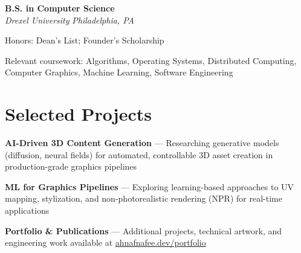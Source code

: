 \documentclass[letterpaper,10pt]{article}
\newcommand{\education}[4]{%
  \textbf{#1} \hfill \textit{#3}\\[-1pt]
  \textit{#2} \hfill \textit{#4}\par\vspace{2pt}
}
\begin{document}
\education{B.S. in Computer Science}{Drexel University}{}{Philadelphia, PA}
\begin{tightitemize}
  \item Honors: Dean's List; Founder's Scholarship
  \item Relevant coursework: Algorithms, Operating Systems, Distributed Computing, Computer Graphics, Machine Learning, Software Engineering
\end{tightitemize}

\section*{Selected Projects}
\begin{tightitemize}
\item \textbf{AI-Driven 3D Content Generation} --- Researching generative models (diffusion, neural fields) for automated, controllable 3D asset creation in production-grade graphics pipelines
\item \textbf{ML for Graphics Pipelines} --- Exploring learning-based approaches to UV mapping, stylization, and non-photorealistic rendering (NPR) for real-time applications
\item \textbf{Portfolio \& Publications} --- Additional projects, technical artwork, and engineering work available at \href{https://www.ahnafnafee.dev/portfolio}{ahnafnafee.dev/portfolio}
\end{tightitemize}
\end{document}
